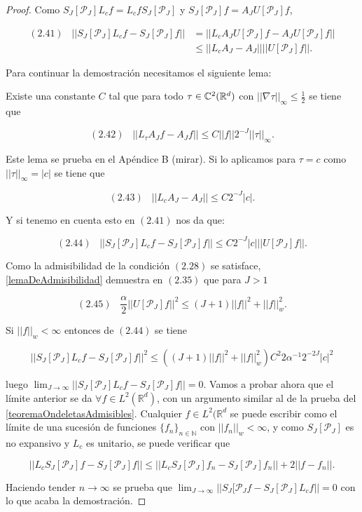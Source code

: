 \begin{proof}

\noindent Como $S_J[\mathcal{P}_J] L_cf = L_cf S_J[\mathcal{P}_J]$ y $S_J[\mathcal{P}_J]f=A_J U[\mathcal{P}_J]f$,

\begin{align*}
    (2.41) \;\;\; ||S_J[\mathcal{P}_J] L_cf - S_J[\mathcal{P}_J]f || &= ||L_c A_J U[\mathcal{P}_J]f - A_J U[\mathcal{P}_J]f|| \\
    &\leq ||L_c A_J - A_J|| ||U[\mathcal{P}_J]f||.
\end{align*}

\medskip

\noindent Para continuar la demostración necesitamos el siguiente lema: 

\begin{lema}
Existe una constante $C$ tal que para todo $\tau \in \mathbb{C}^2(\mathbb{R}^d)$ con $||\nabla \tau ||_\infty \leq \frac{1}{2}$ se tiene que 

$$(2.42) \;\;\; ||L_\tau A_J f - A_J f|| \leq C ||f||2^{-J}||\tau||_{\infty}.$$
\end{lema}

\noindent Este lema se prueba en el Apéndice B (mirar). Si lo aplicamos para $\tau=c$ como $||\tau||_\infty=|c|$ se tiene que 

$$(2.43) \;\;\; ||L_c A_J - A_J|| \leq C 2^{-J} |c|.$$

\noindent Y si tenemo en cuenta esto en $(2.41)$ nos da que: 

$$(2.44) \;\;\; ||S_J[\mathcal{P}_J] L_cf - S_J[\mathcal{P}_J]f || \leq C 2^{-J} |c| ||U[\mathcal{P}_J]f||.$$

\noindent Como la admisibilidad de la condición $(2.28)$ se satisface, \autoref{lemaDeAdmisibilidad} demuestra en $(2.35)$ que para $J>1$

$$(2.45) \;\;\; \frac{\alpha}{2}||U[\mathcal{P}_J]f||^2 \leq (J+1)||f||^2+||f||^2_w.$$

\noindent Si $||f||_w < \infty$ entonces de $(2.44)$ se tiene

$$||S_J[\mathcal{P}_J] L_cf - S_J[\mathcal{P}_J]f ||^2 \leq ((J+1)||f||^2+||f||_w^2)C^2 2 \alpha^{-1} 2^{-2J} |c|^2$$

\noindent luego $\lim_{J\rightarrow\infty}||S_J[\mathcal{P}_J] L_cf - S_J[\mathcal{P}_J]f ||=0$.
\noindent Vamos a probar ahora que el límite anterior se da $\forall f \in L^2(\mathbb{R}^d)$, con un argumento similar al de la prueba del \autoref{teoremaOndeletasAdmisibles}. Cualquier $f\in L^2(\mathbb{R}^d$ se puede escribir como el límite de una sucesión de funciones $\lbrace f_n \rbrace_{n\in\mathbb{N}}$ con $||f_n||_w < \infty$, y como $S_J[\mathcal{P}_J]$ es no expansivo y $L_c$ es unitario, se puede verificar que 

$$||L_c S_J[\mathcal{P}_J]f-S_J[\mathcal{P}_J]f|| \leq ||L_c S_J [\mathcal{P}_J]f_n -S_J[\mathcal{P}_J]f_n|| + 2||f-f_n||.$$

\noindent Haciendo tender $n \rightarrow \infty$ se prueba que $\lim_{J\rightarrow \infty}||S_J[\mathcal{P}_J f-S_J[\mathcal{P}_J] L_cf||=0$ con lo que acaba la demostración. \qedhere
\end{proof}
